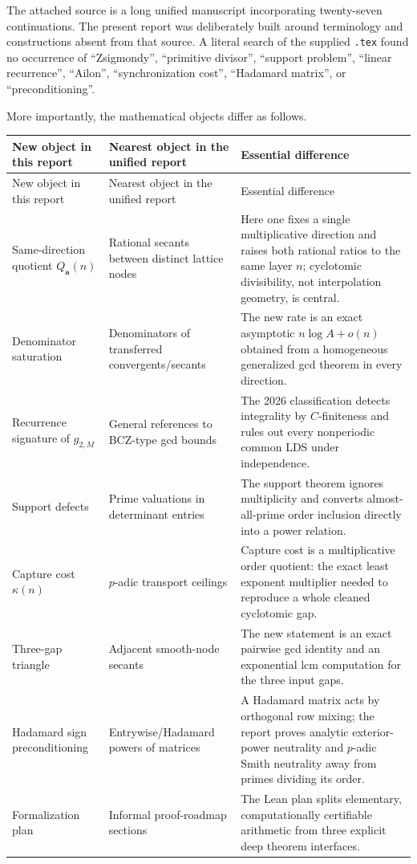 \documentclass[11pt,oneside]{article}
\theoremstyle{definition}
\theoremstyle{remark}
\begin{document}
The attached source is a long unified manuscript incorporating twenty-seven continuations.
The present report was deliberately built around terminology and constructions absent from
that source.  A literal search of the supplied \texttt{.tex} found no occurrence of
``Zsigmondy'', ``primitive divisor'', ``support problem'', ``linear recurrence'', ``Ailon'',
``synchronization cost'', ``Hadamard matrix'', or ``preconditioning''.

More importantly, the mathematical objects differ as follows.

\begin{longtable}{@{}p{}p{}p{}@{}}
\toprule
New object in this report & Nearest object in the unified report & Essential difference \\
\midrule
\endfirsthead
\toprule
New object in this report & Nearest object in the unified report & Essential difference \\
\midrule
\endhead
Same-direction quotient
$Q_{\mathbf a}(n)$ & Rational secants between distinct lattice nodes & Here one fixes a
single multiplicative direction and raises both rational ratios to the same layer $n$;
cyclotomic divisibility, not interpolation geometry, is central. \\
Denominator saturation & Denominators of transferred convergents/secants & The new rate is
an exact asymptotic $n\log A+o(n)$ obtained from a homogeneous generalized gcd theorem in
every direction. \\
Recurrence signature of $g_{2,M}$ & General references to BCZ-type gcd bounds & The 2026
classification detects integrality by $C$-finiteness and rules out every nonperiodic common
LDS under independence. \\
Support defects & Prime valuations in determinant entries & The support theorem ignores
multiplicity and converts almost-all-prime order inclusion directly into a power relation. \\
Capture cost $\kappa(n)$ & $p$-adic transport ceilings & Capture cost is a multiplicative
order quotient: the exact least exponent multiplier needed to reproduce a whole cleaned
cyclotomic gap. \\
Three-gap triangle & Adjacent smooth-node secants & The new statement is an exact pairwise
gcd identity and an exponential lcm computation for the three input gaps. \\
Hadamard sign preconditioning & Entrywise/Hadamard powers of matrices & A Hadamard matrix
acts by orthogonal row mixing; the report proves analytic exterior-power neutrality and
$p$-adic Smith neutrality away from primes dividing its order. \\
Formalization plan & Informal proof-roadmap sections & The Lean plan splits elementary,
computationally certifiable arithmetic from three explicit deep theorem interfaces. \\
\bottomrule
\end{longtable}
\end{document}
